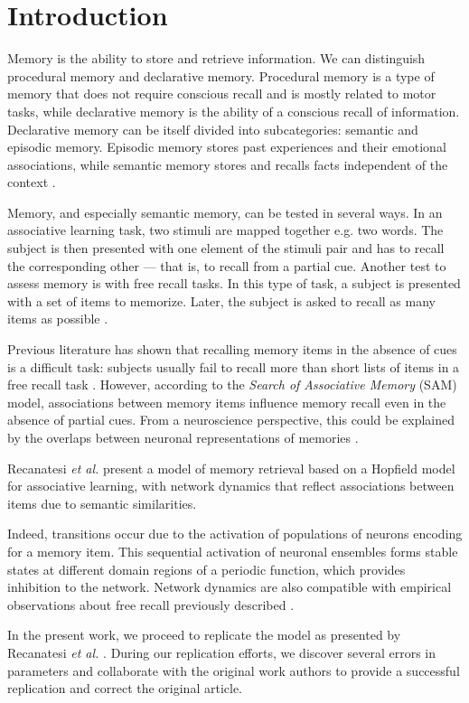 \section{Introduction}

Memory is the ability to store and retrieve information.
We can distinguish procedural memory and declarative memory.
Procedural memory is a type of memory that does not require conscious recall and is mostly related to motor tasks, while declarative memory is the ability of a conscious recall of information.
Declarative memory can be itself divided into subcategories: semantic and episodic memory.
Episodic memory stores past experiences and their emotional associations, while semantic memory stores and recalls facts independent of the context \parencite{squire2009}.

Memory, and especially semantic memory, can be tested in several ways.
In an associative learning task, two stimuli are mapped together e.g. two words.
The subject is then presented with one element of the stimuli pair and has to recall the corresponding other --- that is, to recall from a partial cue.
Another test to assess memory is with free recall tasks.
In this type of task, a subject is presented with a set of items to memorize.
Later, the subject is asked to recall as many items as possible \parencite{tulving2000}.

Previous literature has shown that recalling memory items in the absence of cues is a difficult task: subjects usually fail to recall more than short lists of items in a free recall task \parencite{murdock1960}. %
However, according to the \textit{Search of Associative Memory} (SAM) model, associations between memory items influence memory recall even in the absence of partial cues.
From a neuroscience perspective, this could be explained by the overlaps between neuronal representations of memories \parencite{raaijmakers1981, romani2013}.

Recanatesi \textit{et al.} \parencite{recanatesi2015} present a model of memory retrieval based on a Hopfield model for associative learning, with network dynamics that reflect associations between items due to semantic similarities.

Indeed, transitions occur due to the activation of populations of neurons encoding for a memory item.
This sequential activation of neuronal ensembles forms stable states at different domain regions of a periodic function, which provides inhibition to the network.
Network dynamics are also compatible with empirical observations about free recall previously described \parencite{recanatesi2015}.

In the present work, we proceed to replicate the model as presented by Recanatesi \textit{et al.} \cite{recanatesi2015}.
During our replication efforts, we discover several errors in parameters and collaborate with the original work authors to provide a successful replication and correct the original article.